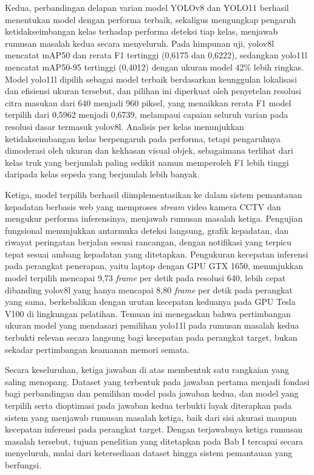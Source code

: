 Kedua, perbandingan delapan varian model YOLOv8 dan YOLO11 berhasil menentukan model 
dengan performa terbaik, sekaligus mengungkap pengaruh ketidakseimbangan kelas terhadap 
performa deteksi tiap kelas, menjawab rumusan masalah kedua secara menyeluruh. Pada 
himpunan uji, yolov8l mencatat mAP50 dan rerata F1 tertinggi (0,6175 dan 0,6222), 
sedangkan yolo11l mencatat mAP50-95 tertinggi (0,4012) dengan ukuran model 42\% lebih 
ringkas. Model yolo11l dipilih sebagai model terbaik berdasarkan keunggulan lokalisasi dan 
efisiensi ukuran tersebut, dan pilihan ini diperkuat oleh penyetelan resolusi citra 
masukan dari 640 menjadi 960 piksel, yang menaikkan rerata F1 model terpilih dari 0,5962 
menjadi 0,6739, melampaui capaian seluruh varian pada resolusi dasar termasuk yolov8l. 
Analisis per kelas menunjukkan ketidakseimbangan kelas berpengaruh pada performa, tetapi 
pengaruhnya dimoderasi oleh ukuran dan kekhasan visual objek, sebagaimana terlihat dari 
kelas truk yang berjumlah paling sedikit namun memperoleh F1 lebih tinggi daripada kelas 
sepeda yang berjumlah lebih banyak.

Ketiga, model terpilih berhasil diimplementasikan ke dalam sistem pemantauan kepadatan 
berbasis web yang memproses \textit{stream} video kamera CCTV dan mengukur performa 
inferensinya, menjawab rumusan masalah ketiga. Pengujian fungsional menunjukkan antarmuka 
deteksi langsung, grafik kepadatan, dan riwayat peringatan berjalan sesuai rancangan, 
dengan notifikasi yang terpicu tepat sesuai ambang kepadatan yang ditetapkan. Pengukuran 
kecepatan inferensi pada perangkat penerapan, yaitu laptop dengan GPU GTX 1650, 
menunjukkan model terpilih mencapai 9,73 \textit{frame} per detik pada resolusi 640, lebih 
cepat dibanding yolov8l yang hanya mencapai 8,80 \textit{frame} per detik pada perangkat 
yang sama, berkebalikan dengan urutan kecepatan keduanya pada GPU Tesla V100 di lingkungan 
pelatihan. Temuan ini menegaskan bahwa pertimbangan ukuran model yang mendasari pemilihan 
yolo11l pada rumusan masalah kedua terbukti relevan secara langsung bagi kecepatan pada 
perangkat target, bukan sekadar pertimbangan keamanan memori semata.

Secara keseluruhan, ketiga jawaban di atas membentuk satu rangkaian yang saling menopang. 
Dataset yang terbentuk pada jawaban pertama menjadi fondasi bagi perbandingan dan 
pemilihan model pada jawaban kedua, dan model yang terpilih serta dioptimasi pada jawaban 
kedua terbukti layak diterapkan pada sistem yang menjawab rumusan masalah ketiga, baik 
dari sisi akurasi maupun kecepatan inferensi pada perangkat target. Dengan terjawabnya 
ketiga rumusan masalah tersebut, tujuan penelitian yang ditetapkan pada Bab I tercapai 
secara menyeluruh, mulai dari ketersediaan dataset hingga sistem pemantauan yang berfungsi.

